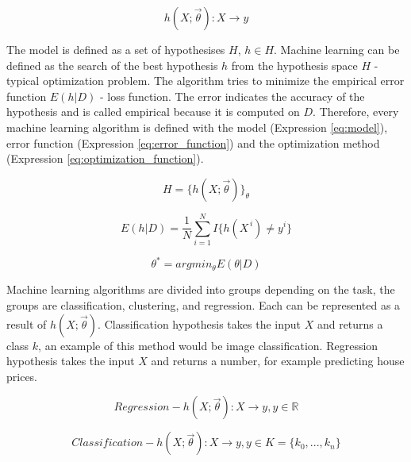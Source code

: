 \documentclass[times, utf8, diplomski]{fer}
\begin{document}
\begin{equation} \label{eq:hypotesis}
    h(X ; \vec{\theta}) : X \to y
\end{equation}


The model is defined as a set of hypothesises $H$, $h \in H$. Machine learning can be defined as the search of the best hypothesis $h$ from the hypothesis space $H$ - typical optimization problem. The algorithm tries to minimize the empirical error function $E(h|D)$ - loss function. The error indicates the accuracy of the hypothesis and is called empirical because it is computed on $D$. Therefore, every machine learning algorithm is defined with the model (Expression \ref{eq:model}), error function (Expression \ref{eq:error_function}) and the optimization method (Expression \ref{eq:optimization_function}).

\begin{equation} \label{eq:model}
    H = \{ h(X ; \vec{\theta}) \}_{\theta}
\end{equation}

\begin{equation} \label{eq:error_function}
    E(h|D) =  \frac{1}{N} \displaystyle\sum_{i=1}^{N} I\{h(X^{\,i}) \neq y^{i}\}
\end{equation}

\begin{equation} \label{eq:optimization_function}
    \theta^{*} = argmin_{\theta} E(\theta | D)
\end{equation}


Machine learning algorithms are divided into groups depending on the task, the groups are classification, clustering, and regression. Each can be represented as a result of $h(X ; \vec{\theta})$. Classification hypothesis takes the input $X$ and returns a class $k$, an example of this method would be image classification. Regression hypothesis takes the input $X$ and returns a number, for example predicting house prices.

\begin{equation} \label{eq:regression_def}
    Regression - h(X ; \vec{\theta}) : X \to y, y \in \mathbb{R}
\end{equation}

\begin{equation} \label{eq:classification_def}
    Classification  - h(X ; \vec{\theta}) : X \to y, y \in K = \{k_{0}, ..., k_{n}\}
\end{equation}
\end{document}

